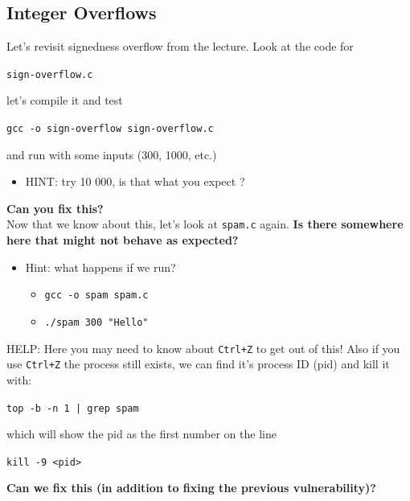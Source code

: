 \documentclass{article}
\begin{document}
\subsection{Integer Overflows}
\noindent Let’s revisit signedness overflow from the lecture. Look at the code for
\begin{center}
    \lstinline{sign-overflow.c}
\end{center}
let’s compile it and test
\begin{center}
    \lstinline{gcc -o sign-overflow sign-overflow.c}
\end{center}
and run with some inputs (300, 1000, etc.)
\begin{itemize}
    \item HINT: try 10 000, is that what you expect ?
\end{itemize}
\noindent \textbf{Can you fix this?}\\


\noindent Now that we know about this, let’s look at \lstinline{spam.c} again. \textbf{Is there somewhere here that might not behave as expected?}
\begin{itemize}
    \item Hint: what happens if we run?
    \begin{itemize}
    \item \lstinline{gcc -o spam spam.c}
    \item \lstinline{./spam 300 "Hello"}
\end{itemize}
\end{itemize}
\noindent HELP: Here you may need to know about \lstinline{Ctrl+Z} to get out of this!
Also if you use \lstinline{Ctrl+Z} the process still exists, we can find it’s process ID (pid) and kill it with:
\begin{center}
    \lstinline{top -b -n 1 | grep spam}
\end{center}
\noindent which will show the pid as the first number on the line
\begin{center}
    \lstinline{kill -9 <pid>}
\end{center}
\noindent\textbf{Can we fix this (in addition to fixing the previous vulnerability)?}\\
\end{document}
